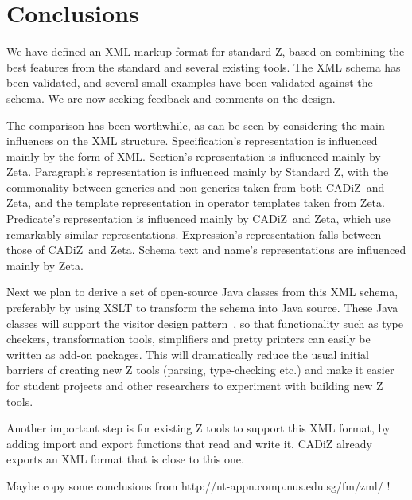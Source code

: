 \documentclass{llncs}  %
\newcommand{\CADiZ}{CADiZ}
\newcommand{\Zeta}{Zeta}
\begin{document}
 
\section{Conclusions}

We have defined an XML markup format for standard Z, based on
combining the best features from the standard and several existing 
tools.  The XML schema has been validated, and several small examples
have been validated against the schema.  We are now seeking feedback 
and comments on the design.

The comparison has been worthwhile,
as can be seen by considering the main influences on the XML structure.
Specification's representation is influenced mainly by the form of XML.
Section's representation is influenced mainly by \Zeta.
Paragraph's representation is influenced mainly by Standard Z,
with the commonality between generics and non-generics taken from
both \CADiZ\ and \Zeta,
and the template representation in operator templates taken from \Zeta.
Predicate's representation is influenced mainly by \CADiZ\ and \Zeta,
which use remarkably similar representations.
Expression's representation falls between those of \CADiZ\ and \Zeta.
Schema text and name's representations are influenced mainly by \Zeta.

Next we plan to derive a set of open-source Java classes from this XML
schema, preferably by using XSLT to transform the schema into Java source.
These Java classes will support the visitor design
pattern~\cite{Patterns???}, so that functionality such as type checkers,
transformation tools, simplifiers and pretty printers can easily be written
as add-on packages.  This will dramatically reduce the usual initial
barriers of creating new Z tools (parsing, type-checking etc.) and make it
easier for student projects and other researchers to experiment with
building new Z tools.

Another important step is for existing Z tools to support this
XML format, by adding import and export functions that read and write it.
{\CADiZ} already exports an XML format that is close to this one.

Maybe copy some conclusions from http://nt-appn.comp.nus.edu.sg/fm/zml/ !



\end{document}
